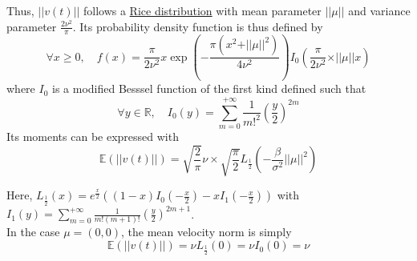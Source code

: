 \documentclass[11pt]{article}
\newcommand {\R}{\mathbb{R}}
\newcommand {\E}{\mathbb{E}}
\newcommand {\1}{\mathbb{1}}
\begin{document}
\begin{figure}[H]
	\centering
\end{figure}
Thus, $ \vert \vert v(t) \vert \vert$ follows a \href{https://en.wikipedia.org/wiki/Rice_distribution}{Rice distribution} with mean parameter $\vert \vert \mu \vert \vert$ and variance parameter $\frac{2\nu^2}{\pi}$. Its probability density function is thus defined by
\[\forall x \geq 0, \quad f(x)= \frac{\pi}{2\nu^2}x \exp\left(-\frac{\pi (x^2+ \vert \vert \mu \vert \vert^2)}{4\nu^2}\right) I_{0}\left(   \frac{\pi}{2\nu^2}\times \vert \vert \mu \vert \vert x \right)\]
where $I_0$ is a modified Besssel function of the first kind defined such that 
\[\forall y  \in \R, \quad I_0(y)=\sum_{m=0}^{+\infty} \frac{1}{m!^2}\left(\frac{y}{2}\right)^{2m}\]
Its moments can be expressed with
\[\E\left(\vert \vert v(t) \vert \vert\right)=\sqrt{\frac{2}{\pi}}\nu \times \sqrt{\frac{\pi}{2}} L_{\frac{1}{2}} \left( -\frac{\beta}{\sigma^2} \vert \vert \mu \vert \vert ^2 \right)\]

Here, $L_{\frac{1}{2}}(x)=e^{\frac{x}{2}} \left( (1-x) I_0\left( -\frac{x}{2}\right)-xI_1\left( -\frac{x}{2}\right)\right)$ with $I_1(y)=\sum_{m=0}^{+\infty} \frac{1}{m!(m+1)!}\left(\frac{y}{2}\right)^{2m+1}$.\\

In the case $\mu=(0,0)$, the mean velocity norm is simply 
\[\E(\vert \vert v(t) \vert \vert)=\nu L_{\frac{1}{2}}(0)=\nu I_{0}(0)=\nu\]
\end{document}
